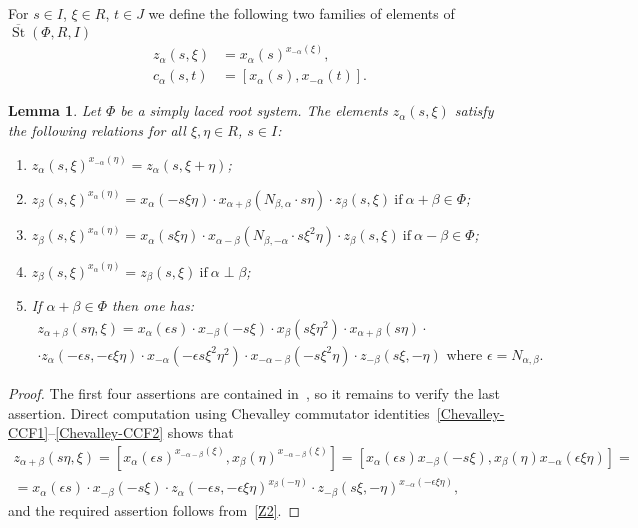 \documentclass[oneside, 8pt]{amsart}
\newtheorem{lemma}{Lemma}
\theoremstyle{remark}
\theoremstyle{definition}
\numberwithin{lemma}{section}
\numberwithin{prop}{section}
\numberwithin{corollary}{section}
\numberwithin{externaltheorem}{section}
\DeclareMathOperator{\St}{St}
\numberwithin{equation}{section}
\begin{document}
For $s\in I$, $\xi \in R$, $t \in J$ we define the following two families of elements of $\overline{\St}(\Phi, R, I)$ 
\begin{align}
 z_\alpha(s, \xi) &= x_\alpha(s)^{x_{-\alpha}(\xi)}, \label{Zdef}\\
 c_\alpha(s, t)   &= [x_\alpha(s), x_{-\alpha}(t)]. \label{Cdef}
\end{align}

\begin{lemma}\label{Zrels} Let $\Phi$ be a simply laced root system.
The elements $z_\alpha(s, \xi)$ satisfy the following relations for all $\xi, \eta\in R$, $s\in I$:
\begin{enumerate} 
\item\label{Z1} $z_{\alpha}(s, \xi) ^ {x_{-\alpha}(\eta)} = z_{\alpha}(s, \xi + \eta)$;
\item\label{Z2} $z_{\beta}(s, \xi) ^ {x_{\alpha}(\eta)} = x_{\alpha} (- s\xi \eta) \cdot x_{\alpha+\beta} (N_{\beta, \alpha}\cdot s\eta)     \cdot z_{\beta}(s, \xi)\ \text{if}\ \alpha + \beta \in \Phi$;
\item\label{Z3} $z_{\beta}(s, \xi) ^ {x_{\alpha}(\eta)} = x_{\alpha} (s\xi \eta) \cdot x_{\alpha-\beta} (N_{\beta,-\alpha}\cdot s\xi^2\eta) \cdot z_{\beta}(s, \xi)\ \text{if}\ \alpha - \beta \in \Phi$;

\item\label{Z4} $z_{\beta}(s, \xi) ^ {x_{\alpha}(\eta)} = z_{\beta}(s, \xi)\ \text{if}\ \alpha\perp\beta$;
\item If $\alpha+\beta\in\Phi$ then one has:
\begin{multline} \label{Z5} z_{\alpha+\beta}(s\eta, \xi) = x_\alpha(\epsilon s)\cdot x_{-\beta}(-s\xi) \cdot x_{\beta}(s\xi\eta^2) \cdot x_{\alpha+\beta}(s \eta) \cdot \\ \cdot z_\alpha(-\epsilon s, -\epsilon \xi\eta) \cdot
  x_{-\alpha}(-\epsilon s\xi^2\eta^2) \cdot x_{-\alpha-\beta}(- s \xi^2 \eta) \cdot z_{-\beta}(s\xi, -\eta)\text{ where $\epsilon = N_{\alpha,\beta}$.}\end{multline}
\end{enumerate} \end{lemma}
\begin{proof}
The first four assertions are contained in~\cite[Lemma~9]{S15}, so it remains to verify the last assertion.
Direct computation using Chevalley commutator identities~\eqref{Chevalley-CCF1}--\eqref{Chevalley-CCF2} shows that
\begin{multline} \nonumber
  z_{\alpha+\beta}(s\eta, \xi) = [x_\alpha(\epsilon s)^{x_{-\alpha-\beta}(\xi)}, x_\beta(\eta)^{x_{-\alpha-\beta}(\xi)}] =
  [x_\alpha(\epsilon s) x_{-\beta}(-s\xi), x_{\beta}(\eta) x_{-\alpha}(\epsilon \xi\eta)] = \\ 
  = x_\alpha(\epsilon s) \cdot x_{-\beta}(-s\xi) \cdot z_\alpha(-\epsilon s, -\epsilon \xi\eta)^{x_{\beta}(-\eta)} \cdot z_{-\beta}(s\xi, -\eta)^{x_{-\alpha}(-\epsilon \xi\eta)},
\end{multline} 
and the required assertion follows from~\eqref{Z2}.
\end{proof}
\end{document}
